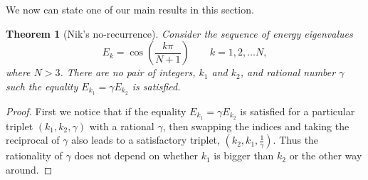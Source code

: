 \documentclass[a4paper, 10pt, draft]{article}
\theoremstyle{plain}
\newtheorem*{theorem*}{Theorem}
\begin{document}
\noindent
We now can state one of our main results in this section.
\begin{theorem*}[Nik's no-recurrence]
    Consider the sequence of energy eigenvalues
    \begin{equation*}
        E_{k} = \cos{\!\left ( \frac{k \pi}{N+1} \right )}
        \qquad k=1, 2, \dots N,
    \end{equation*}
    where $N >3$. There are no pair of integers, $k_{1}$ and $k_{2}$, and
    rational number $\gamma$ such the equality $E_{k_{1}} = \gamma E_{k_{2}}$ is
    satisfied.
\end{theorem*}
\begin{proof}
    First we notice that if the equality $E_{k_{1}} = \gamma E_{k_{2}}$ is
    satisfied for a particular triplet $(k_{1}, k_{2}, \gamma)$ with a rational
    $\gamma$, then swapping the indices and taking the reciprocal of $\gamma$
    also leads to a satisfactory triplet, $(k_{2}, k_{1}, \frac{1}{\gamma})$.
    Thus the rationality of $\gamma$ does not depend on whether $k_{1}$ is
    bigger than $k_{2}$ or the other way around.


\end{proof}
\end{document}
